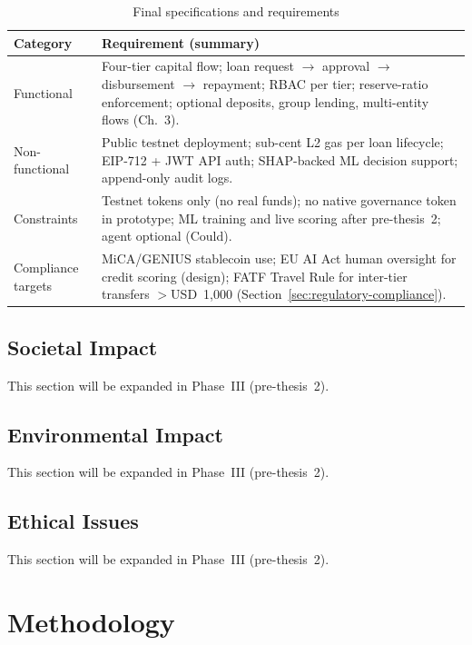 \documentclass[12pt, a4paper]{report}
\newcommand{\tableheadcolor}{\rowcolor{TableHeadBg}}
\begin{document}
\begin{table}[H]
\centering
\caption[Final specifications and requirements]{Final specifications and requirements}
\label{tab:final-requirements}
\footnotesize
\begin{tabular}{p{2.4cm}p{11.6cm}}
\toprule
\tableheadcolor
\textbf{Category} & \textbf{Requirement (summary)} \\
\midrule
Functional & Four-tier capital flow; loan request $\to$ approval $\to$ disbursement $\to$ repayment; RBAC per tier; reserve-ratio enforcement; optional deposits, group lending, multi-entity flows (Ch.~3). \\
Non-functional & Public testnet deployment; sub-cent L2 gas per loan lifecycle; EIP-712 + JWT API auth; SHAP-backed ML decision support; append-only audit logs. \\
Constraints & Testnet tokens only (no real funds); no native governance token in prototype; ML training and live scoring after pre-thesis~2; agent optional (Could). \\
Compliance targets & MiCA/GENIUS stablecoin use; EU AI Act human oversight for credit scoring (design); FATF Travel Rule for inter-tier transfers $>$USD~1{,}000 (Section~\ref{sec:regulatory-compliance}). \\
\bottomrule
\end{tabular}
\end{table}

\section{Societal Impact}
\label{sec:societal-impact}

This section will be expanded in Phase~III (pre-thesis~2).

\section{Environmental Impact}
\label{sec:environmental-impact}

This section will be expanded in Phase~III (pre-thesis~2).

\section{Ethical Issues}
\label{sec:ethical-issues-ch3}

This section will be expanded in Phase~III (pre-thesis~2).

\chapter{Methodology}
\end{document}
